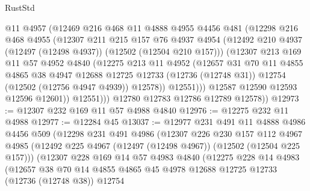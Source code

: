 \begin{lexlean}{RustStd}
\begin{coremodule}
                @11
                @4957
                (@12469
                  @216
                  @468
                  @11
                  @4888
                  @4955
                  @4456
                  @481
                  (@12298
                    @216
                    @468
                    @4955
                    (@12307
                      @211
                      @215
                      @157
                      @76
                      @4937
                      @4954
                      (@12492 @210 @4937 (@12497 (@12498 @4937)) (@12502 (@12504 @210 @157)))
                      (@12307
                        @213
                        @169
                        @11
                        @57
                        @4952
                        @4840
                        (@12275
                          @213
                          @11
                          @4952
                          (@12657
                            @31
                            @70
                            @11
                            @4855
                            @4865
                            @38
                            @4947
                            @12688
                            @12725
                            @12733
                            (@12736 (@12748 @31))
                            @12754
                            (@12502 (@12756 @4947 @4939))
                            @12578))
                        @12551)))
                  @12587
                  @12590
                  @12593
                  @12596
                  @12601))
              @12551)))
        @12780
        @12783
        @12786
        @12789
        @12578))
@12973 := @12307 @232 @169 @11 @57 @4988 @4840
@12976 := @12275 @232 @11 @4988
@12977 := @12284 @45
@13037 := @12977
    @231
    @491
    @11
    @4888
    @4986
    @4456
    @509
    (@12298
      @231
      @491
      @4986
      (@12307
        @226
        @230
        @157
        @112
        @4967
        @4985
        (@12492 @225 @4967 (@12497 (@12498 @4967)) (@12502 (@12504 @225 @157)))
        (@12307
          @228
          @169
          @14
          @57
          @4983
          @4840
          (@12275
            @228
            @14
            @4983
            (@12657
              @38
              @70
              @14
              @4855
              @4865
              @45
              @4978
              @12688
              @12725
              @12733
              (@12736 (@12748 @38))
              @12754

\end{coremodule}
\end{lexlean}

